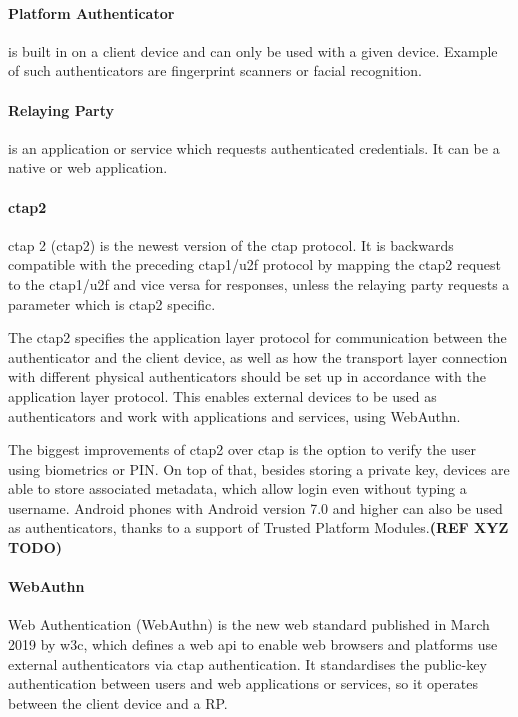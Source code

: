 \paragraph{Platform Authenticator} 
is built in on a client device and can only be used with a given device. Example of such authenticators are fingerprint scanners or facial recognition.

\paragraph{Relaying Party} 
is an application or service which requests authenticated credentials. It can be a native or web application.

\paragraph{\acrshort{ctap}2}
\acrlong{ctap} 2 (\acrshort{ctap}2) is the newest version of the \acrshort{ctap} protocol. It is backwards compatible with the preceding \acrshort{ctap}1/\acrshort{u2f} protocol by mapping the \acrshort{ctap}2 request to the \acrshort{ctap}1/\acrshort{u2f} and vice versa for responses, unless the relaying party requests a parameter which is \acrshort{ctap}2 specific. 

The \acrshort{ctap}2 specifies the application layer protocol for communication between the authenticator and the client device, as well as how the transport layer connection with different physical authenticators should be set up in accordance with the application layer protocol. This enables external devices to be used as authenticators and work with applications and services, using WebAuthn.

The biggest improvements of \acrshort{ctap}2 over \acrshort{ctap} is the option to verify the user using biometrics or PIN. On top of that, besides storing a private key, devices are able to store associated metadata, which allow login even without typing a username. Android phones with Android version 7.0 and higher can also be used as authenticators, thanks to a support of Trusted Platform Modules.\textbf{(REF XYZ TODO)}

\paragraph{WebAuthn} 
Web Authentication (WebAuthn) is the new web standard published in March 2019  by \acrshort{w3c}, which defines a web \acrshort{api} to enable web browsers and platforms use external authenticators via \acrshort{ctap} authentication. It standardises the public-key authentication between users and web applications or services, so it operates between the client device and a RP.

